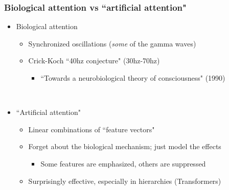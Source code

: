 \documentclass{beamer}
\newcommand{\msmagenta}[1]{{\color{mymagenta} #1}}
\begin{document}
\begin{frame}

\frametitle{Biological attention vs ``artificial attention"}

\begin{itemize}

\item Biological attention

\begin{itemize}

\item Synchronized oscillations ({\it some} of the gamma waves)

\item Crick-Koch ``40hz conjecture"  (30hz-70hz)

\begin{itemize}
\item ``Towards a neurobiological theory of consciousness" (1990)
\end{itemize}

\end{itemize}


\ \\

\item ``Artificial attention"

\begin{itemize}

\item Linear combinations of ``feature vectors"

\item Forget about the biological mechanism; \msmagenta{just model the effects}

\begin{itemize}
\item Some features are emphasized, others are suppressed
\end{itemize}

\item Surprisingly effective, especially in hierarchies (Transformers)

\end{itemize}

\end{itemize}

\end{frame}
\end{document}
